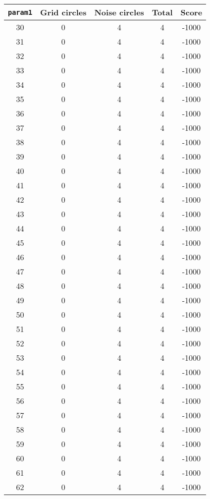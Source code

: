 \documentclass[letterpaper, 12pt]{article}
\begin{document}
\begin{longtable}{|c|c|c|c|c|}
\hline
\textbf{\texttt{param1}} & \textbf{Grid circles} & \textbf{Noise circles} & \textbf{Total} & \textbf{Score} \\
\hline
30 & 0 & 4 & 4 & -1000 \\
\hline
31 & 0 & 4 & 4 & -1000 \\
\hline
32 & 0 & 4 & 4 & -1000 \\
\hline
33 & 0 & 4 & 4 & -1000 \\
\hline
34 & 0 & 4 & 4 & -1000 \\
\hline
35 & 0 & 4 & 4 & -1000 \\
\hline
36 & 0 & 4 & 4 & -1000 \\
\hline
37 & 0 & 4 & 4 & -1000 \\
\hline
38 & 0 & 4 & 4 & -1000 \\
\hline
39 & 0 & 4 & 4 & -1000 \\
\hline
40 & 0 & 4 & 4 & -1000 \\
\hline
41 & 0 & 4 & 4 & -1000 \\
\hline
42 & 0 & 4 & 4 & -1000 \\
\hline
43 & 0 & 4 & 4 & -1000 \\
\hline
44 & 0 & 4 & 4 & -1000 \\
\hline
45 & 0 & 4 & 4 & -1000 \\
\hline
46 & 0 & 4 & 4 & -1000 \\
\hline
47 & 0 & 4 & 4 & -1000 \\
\hline
48 & 0 & 4 & 4 & -1000 \\
\hline
49 & 0 & 4 & 4 & -1000 \\
\hline
50 & 0 & 4 & 4 & -1000 \\
\hline
51 & 0 & 4 & 4 & -1000 \\
\hline
52 & 0 & 4 & 4 & -1000 \\
\hline
53 & 0 & 4 & 4 & -1000 \\
\hline
54 & 0 & 4 & 4 & -1000 \\
\hline
55 & 0 & 4 & 4 & -1000 \\
\hline
56 & 0 & 4 & 4 & -1000 \\
\hline
57 & 0 & 4 & 4 & -1000 \\
\hline
58 & 0 & 4 & 4 & -1000 \\
\hline
59 & 0 & 4 & 4 & -1000 \\
\hline
60 & 0 & 4 & 4 & -1000 \\
\hline
61 & 0 & 4 & 4 & -1000 \\
\hline
62 & 0 & 4 & 4 & -1000 \\

\end{longtable}
\end{document}
